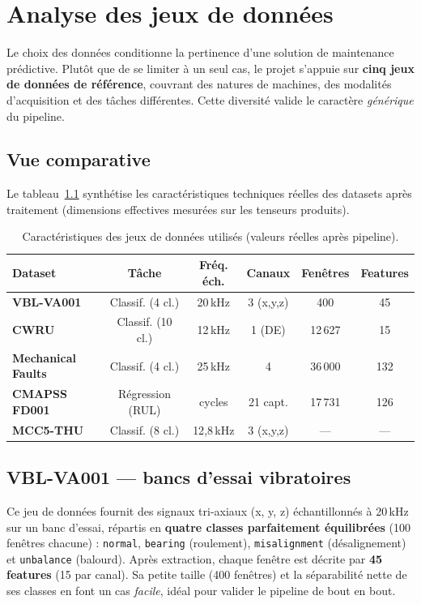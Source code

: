 \chapter{Analyse des jeux de données}
\label{chap:datasets}

Le choix des données conditionne la pertinence d'une solution de maintenance prédictive.
Plutôt que de se limiter à un seul cas, le projet s'appuie sur \textbf{cinq jeux de données
de référence}, couvrant des natures de machines, des modalités d'acquisition et des tâches
différentes. Cette diversité valide le caractère \emph{générique} du pipeline.

\section{Vue comparative}
Le tableau~\ref{tab:datasets} synthétise les caractéristiques techniques réelles des
datasets après traitement (dimensions effectives mesurées sur les tenseurs produits).

\begin{table}[h]
\centering
\small
\caption{Caractéristiques des jeux de données utilisés (valeurs réelles après pipeline).}
\label{tab:datasets}
\begin{tabular}{>{\bfseries}l c c c c c}
\toprule
Dataset & Tâche & Fréq. éch. & Canaux & Fenêtres & Features \\
\midrule
VBL-VA001         & Classif. (4 cl.)  & 20\,kHz   & 3 (x,y,z) & 400    & 45  \\
CWRU              & Classif. (10 cl.) & 12\,kHz   & 1 (DE)    & 12\,627 & 15  \\
Mechanical Faults & Classif. (4 cl.)  & 25\,kHz   & 4         & 36\,000 & 132 \\
CMAPSS FD001      & Régression (RUL)  & cycles    & 21 capt.  & 17\,731 & 126 \\
MCC5-THU          & Classif. (8 cl.)  & 12{,}8\,kHz & 3 (x,y,z) & ---    & ---  \\
\bottomrule
\end{tabular}
\end{table}

\section{VBL-VA001 --- bancs d'essai vibratoires}
Ce jeu de données fournit des signaux tri-axiaux (x, y, z) échantillonnés à 20\,kHz sur un
banc d'essai, répartis en \textbf{quatre classes parfaitement équilibrées} (100 fenêtres
chacune) : \texttt{normal}, \texttt{bearing} (roulement), \texttt{misalignment}
(désalignement) et \texttt{unbalance} (balourd). Après extraction, chaque fenêtre est
décrite par \textbf{45 features} (15 par canal). Sa petite taille (400 fenêtres) et la
séparabilité nette de ses classes en font un cas \emph{facile}, idéal pour valider le
pipeline de bout en bout.

